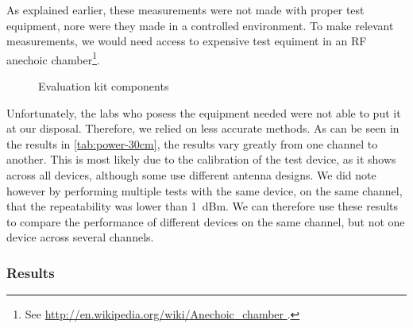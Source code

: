 As explained earlier, these measurements were not made with proper test
equipment, nore were they made in a controlled environment. To make relevant
measurements, we would need access to expensive test equiment in an RF anechoic
chamber\footnote{ See \url{ http://en.wikipedia.org/wiki/Anechoic_chamber }.}.

\begin{figure}[bth]
  \caption{Evaluation kit components}
  \label{fig:eval-kit}
\end{figure}

Unfortunately, the labs who posess the equipment needed were not able to put it
at our disposal. Therefore, we relied on less accurate methods. As can be seen
in the results in \autoref{tab:power-30cm}, the results vary greatly from one
channel to another. This is most likely due to the calibration of the test
device, as it shows across all devices, although some use different antenna
designs. We did note however by performing multiple tests with the same device,
on the same channel, that the repeatability was lower than \SI{1}{dBm}. We can
therefore use these results to compare the performance of different devices on
the same channel, but not one device across several channels.

\subsubsection{Results}\label{power-results}

